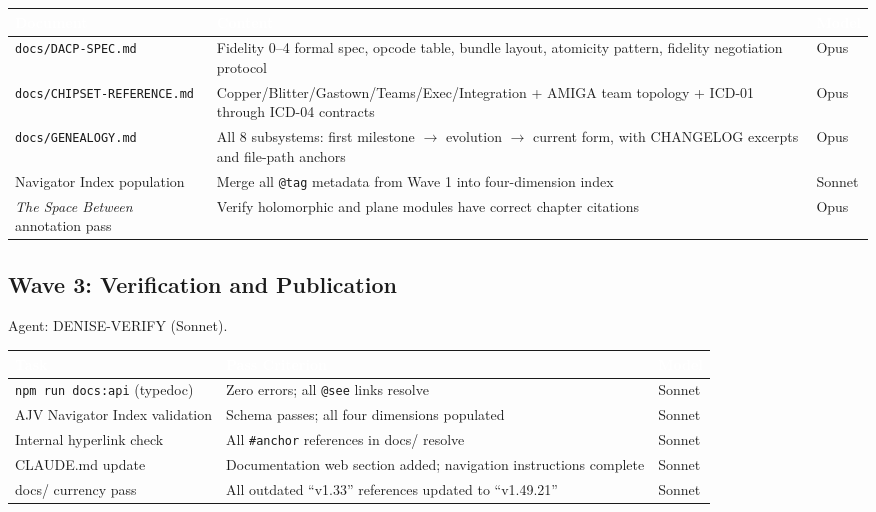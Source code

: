 \documentclass[11pt,letterpaper]{article}
\newcommand{\tableheader}[1]{\textbf{\sffamily\textcolor{white}{#1}}}
\begin{document}
\begin{center}
\begin{tabularx}{\textwidth}{L{4.5cm}XC{1.8cm}}
\toprule
{}
\tableheader{Document} & \tableheader{Content} & \tableheader{Model} \\
\midrule
\texttt{docs/DACP-SPEC.md} & Fidelity 0--4 formal spec, opcode table, bundle layout, atomicity pattern, fidelity negotiation protocol & Opus \\
\texttt{docs/CHIPSET-REFERENCE.md} & Copper/Blitter/Gastown/Teams/Exec/Integration + AMIGA team topology + ICD-01 through ICD-04 contracts & Opus \\
\texttt{docs/GENEALOGY.md} & All 8 subsystems: first milestone $\to$ evolution $\to$ current form, with CHANGELOG excerpts and file-path anchors & Opus \\
Navigator Index population & Merge all \texttt{@tag} metadata from Wave 1 into four-dimension index & Sonnet \\
\textit{The Space Between} annotation pass & Verify holomorphic and plane modules have correct chapter citations & Opus \\
\bottomrule
\end{tabularx}
\end{center}

\subsection{Wave 3: Verification and Publication}

Agent: DENISE-VERIFY (Sonnet).

\begin{center}
\begin{tabularx}{\textwidth}{L{4.5cm}XC{1.8cm}}
\toprule
{}
\tableheader{Task} & \tableheader{Pass Criterion} & \tableheader{Model} \\
\midrule
\texttt{npm run docs:api} (typedoc) & Zero errors; all \texttt{@see} links resolve & Sonnet \\
AJV Navigator Index validation & Schema passes; all four dimensions populated & Sonnet \\
Internal hyperlink check & All \texttt{\#anchor} references in docs/ resolve & Sonnet \\
CLAUDE.md update & Documentation web section added; navigation instructions complete & Sonnet \\
docs/ currency pass & All outdated ``v1.33'' references updated to ``v1.49.21'' & Sonnet \\
\bottomrule
\end{tabularx}
\end{center}
\end{document}
